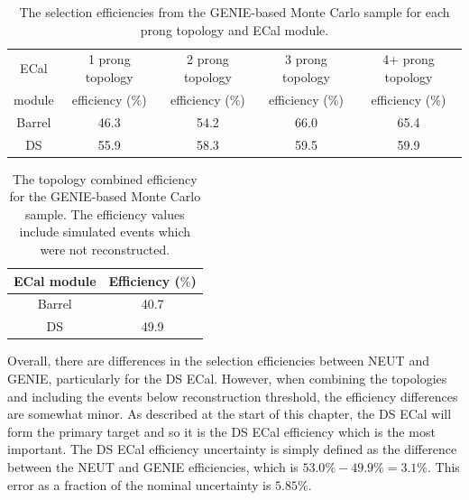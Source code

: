 \begin{table}
  \begin{tabular}{ c c c c c }
    ECal & 1 prong topology & 2 prong topology & 3 prong topology & 4+ prong topology \\
    module & efficiency ($\%$)& efficiency ($\%$)& efficiency ($\%$)& efficiency ($\%$) \\ \hline \hline
    Barrel & 46.3 & 54.2 & 66.0 & 65.4 \\
    DS & 55.9 & 58.3 & 59.5 & 59.9\\
  \end{tabular}
  \caption{The selection efficiencies from the GENIE-based Monte Carlo sample for each prong topology and ECal module.}
  \label{table:SelEfficiencyGENIE}
\end{table}
\begin{table}
  \begin{tabular}{ c c }
    ECal module & Efficiency ($\%$) \\ \hline \hline
    Barrel & 40.7 \\
    DS & 49.9  \\
  \end{tabular}
  \caption{The topology combined efficiency for the GENIE-based Monte Carlo sample.  The efficiency values include simulated events which were not reconstructed.}
  \label{table:FinalEffGENIE}
\end{table}
\newline
\newline
Overall, there are differences in the selection efficiencies between NEUT and GENIE, particularly for the DS ECal.  However, when combining the topologies and including the events below reconstruction threshold, the efficiency differences are somewhat minor.  As described at the start of this chapter, the DS ECal will form the primary target and so it is the DS ECal efficiency which is the most important.  The DS ECal efficiency uncertainty is simply defined as the difference between the NEUT and GENIE efficiencies, which is $53.0\% - 49.9\% = 3.1\%$.  This error as a fraction of the nominal uncertainty is $5.85\%$.
